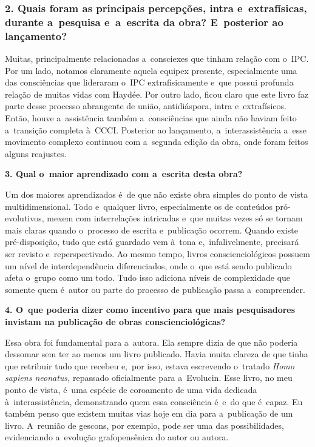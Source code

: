 \documentclass{gescons}
\begin{document}
\begin{multicols}{3}
\subsubsection{2. Quais foram as principais percepções, intra e~extrafísicas, durante a~pesquisa e~a~escrita da obra? E~posterior ao lançamento?}


Muitas, principalmente relacionadas a~consciexes que tinham relação com o~IPC. Por um lado, notamos claramente aquela equipex presente, especialmente uma das consciências que lideraram o~IPC extrafisicamente e~que possui profunda relação de muitas vidas com Haydée. Por outro lado, ficou claro que este livro faz parte desse processo abrangente de união, antidiáspora, intra e~extrafísicos. Então, houve a~assistência também a~consciências que ainda não haviam feito a~transição completa à~CCCI. Posterior ao lançamento, a~interassistência a~esse movimento complexo continuou com a~segunda edição da obra, onde foram feitos alguns reajustes.


\textbf{3. Qual o~maior aprendizado com a~escrita desta obra?}

Um dos maiores aprendizados é~de que não existe obra simples do ponto de vista multidimensional. Todo e~qualquer livro, especialmente os de conteúdos pró-evolutivos, mexem com interrelações intricadas e~que muitas vezes só se tornam mais claras quando o~processo de escrita e~publicação ocorrem. Quando existe pré-disposição, tudo que está guardado vem à~tona e,~infalivelmente, precisará ser revisto e~reperspectivado. Ao mesmo tempo, livros conscienciológicos possuem um nível de interdependência diferenciados, onde o~que está sendo publicado afeta o~grupo como um todo. Tudo isso adiciona níveis de complexidade que somente quem é~autor ou parte do processo de publicação passa a~compreender.

\textbf{4. O~que poderia dizer como incentivo para que mais pesquisadores invistam na publicação de obras conscienciológicas?}

Essa obra foi fundamental para a~autora. Ela sempre dizia de que não poderia dessomar sem ter ao menos um livro publicado. Havia muita clareza de que tinha que retribuir tudo que recebeu e,~por isso, estava escrevendo o~tratado \emph{Homo sapiens neonatus,} repassado oficialmente para a~Evolucin. Esse livro, no meu ponto de vista, é~uma espécie de coroamento de uma vida dedicada à~interassistência, demonstrando quem essa consciência é~e~do que é~capaz. Eu também penso que existem muitas vias hoje em dia para a~publicação de um livro. A~reunião de gescons, por exemplo, pode ser uma das possibilidades, evidenciando a~evolução grafopensênica do autor ou autora.\\




    
    \end{multicols}
\end{document}
